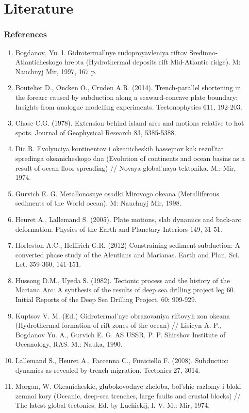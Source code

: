\documentclass[pdflatex,compress,10pt,
	xcolor={dvipsnames,dvipsnames,svgnames,x11names,table},
	hyperref={colorlinks = true,breaklinks = true, urlcolor = NavyBlue, breaklinks = true}]{beamer}
\begin{document}
\section{Literature}
\begin{frame}[allowframebreaks]
\frametitle{References}
\begin{enumerate}
	\item Bogdanov, Yu. l. Gidrotermal'nye rudoproyavleniya riftov Sredinno-Atlanticheskogo
hrebta (Hydrothermal deposits rift Mid-Atlantic ridge). M: Nauchnyj Mir, 1997, 167 p.
	\item Boutelier D., Oncken O., Cruden A.R. (2014). Trench-parallel shortening in the forearc caused by subduction along a seaward-concave plate boundary: Insights from analogue modelling experiments. Tectonophysics 611, 192-203.
	\item Chase C.G. (1978). Extension behind island arcs and motions relative to hot spots. Journal of Geophysical Research 83, 5385-5388.
	\item Dic R. Evolyuciya kontinentov i okeanicheskih bassejnov kak rezul'tat spredinga okeanicheskogo dna (Evolution of continents and ocean basins as a result of ocean floor spreading) // Novaya global'naya tektonika. M.: Mir, 1974.
	\item Gurvich E. G. Metallonosnye osadki Mirovogo okeana (Metalliferous sediments of the World ocean). M: Nauchnyj Mir, 1998.
	\item Heuret A., Lallemand S. (2005). Plate motions, slab dynamics and back-arc deformation. Physics of the Earth and Planetary Interiors 149, 31-51.
	\item Horleston A.C., Helffrich G.R. (2012) Constraining sediment subduction: A converted phase study of the Aleutians and Marianas. Earth and Plan. Sci. Let. 359-360, 141-151.
	\item Hussong D.M., Uyeda S. (1982). Tectonic process and the history of the Mariana Arc: A synthesis of the results of deep sea drilling project leg 60. Initial Reports of the Deep Sea Drilling Project, 60: 909-929.	
	\item Kuptsov V. M. (Ed.) Gidrotermal'nye obrazovaniya riftovyh zon okeana (Hydrothermal formation of rift zones of the ocean) // Lisicyn A. P., Bogdanov Yu. A., Gurvich E. G. AS USSR, P. P. Shirshov Institute of Oceanology, RAS. M.: Nauka, 1990.
	\item Lallemand S., Heuret A., Faccenna C., Funiciello F. (2008). Subduction dynamics as revealed by trench migration. Tectonics 27, 3014.
	\item Morgan, W. Okeanicheskie, glubokovodnye zheloba, bol'shie razlomy i bloki zemnoi kory (Oceanic, deep-sea trenches, large faults and crustal blocks) // The latest global tectonics. Ed. by Luchickij, I. V. M.: Mir, 1974.

\end{enumerate}
\end{frame}
\end{document}
